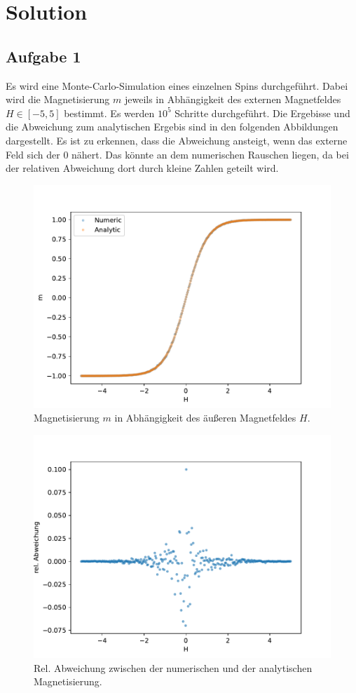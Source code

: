 
\section{Solution}
\label{sec:auswertung}

\subsection{Aufgabe 1} 


Es wird eine Monte-Carlo-Simulation eines einzelnen Spins durchgeführt.
Dabei wird die Magnetisierung $m$ jeweils in Abhängigkeit des externen Magnetfeldes $H \in [-5,5] $ bestimmt.
Es werden $10^5$ Schritte durchgeführt.
Die Ergebisse und die Abweichung zum analytischen Ergebis sind in den folgenden Abbildungen dargestellt.
Es ist zu erkennen, dass die Abweichung ansteigt, wenn das externe Feld sich der $0$ nähert. 
Das könnte an dem numerischen Rauschen liegen, da bei der relativen Abweichung dort durch kleine Zahlen geteilt wird.


\begin{figure}
    \centering
    \includegraphics[width=.9\textwidth]{images/Ex1_Graph.pdf}
    \caption{Magnetisierung $m$ in Abhängigkeit des äußeren Magnetfeldes $H$.}
\end{figure}
\begin{figure}
    \centering
    \includegraphics[width=.9\textwidth]{images/Ex1_Abweichung.pdf}
    \caption{Rel. Abweichung zwischen der numerischen und der analytischen Magnetisierung.}
\end{figure}